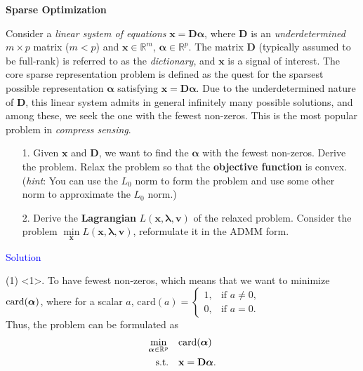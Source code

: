 \item[\uppercase\expandafter{\romannumeral2}.]\textbf{Sparse Optimization}

Consider a \textit{linear system of equations} $\mathbf{x} = \mathbf{D}\boldsymbol{\alpha}$, where $\mathbf{D}$ is an \textit{underdetermined} $m \times p$ matrix ($m < p$) and $\mathbf{x} \in \mathbb{R}^m$, $\boldsymbol{\alpha} \in \mathbb{R}^p$. The matrix $\mathbf{D}$ (typically assumed to be full-rank) is referred to as the \textit{dictionary}, and $\mathbf{x}$ is a signal of interest. The core sparse representation problem is defined as the quest for the sparsest possible representation $\boldsymbol{\alpha}$ satisfying $\mathbf{x} = \mathbf{D}\boldsymbol{\alpha}$. Due to the underdetermined nature of $\mathbf{D}$, this linear system admits in general infinitely many possible solutions, and among these, we seek the one with the fewest non-zeros. This is the most popular problem in \emph{compress sensing}.
\begin{itemize}
\item[1.]
Given $\mathbf{x}$ and $\mathbf{D}$, we want to find the $\boldsymbol{\alpha}$ with the fewest non-zeros. Derive the problem.  Relax the problem so that the \textbf{objective function} is convex.  (\emph{hint}: You can use the $L_0$ norm to form the problem and use some other norm to approximate the $L_0$ norm.)

\item[2.] Derive the \textbf{Lagrangian} $L(\mathbf{x}, \mathbf{\lambda}, \mathbf{v})$ of the relaxed problem.  Consider the problem $\min\limits_{\mathbf{x}} L(\mathbf{x}, \mathbf{\lambda}, \mathbf{v})$, reformulate it in the ADMM form. 
\end{itemize}

\textcolor{blue}{Solution}

(1) <1>. To have fewest non-zeros, which means that we want to minimize $\text{card}(\boldsymbol{\alpha})$, where for a scalar $a$, $\text{card}(a) = \begin{cases}
1, & \text{if } a \neq 0, \\
0, & \text{if } a = 0.
\end{cases}$ \\
Thus, the problem can be formulated as
\begin{align*}
\min_{\boldsymbol{\alpha}\in\mathbb{R}^p} & \quad \text{card}(\boldsymbol{\alpha}) \\
\text{s.t.} & \quad \mathbf{x} = \mathbf{D}\boldsymbol{\alpha}.
\end{align*}


